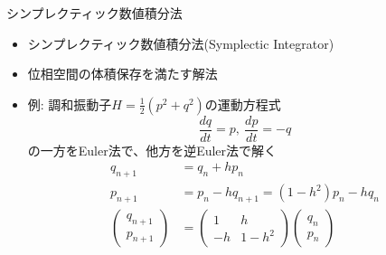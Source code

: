 \begin{frame}[t,fragile]{シンプレクティック数値積分法}
  \begin{itemize}
  \item シンプレクティック数値積分法(Symplectic Integrator)
  \item 位相空間の体積保存を満たす解法
  \item 例: 調和振動子$H=\frac{1}{2}(p^2+q^2)$の運動方程式
    \[
    \frac{dq}{dt} = p, \ \frac{dp}{dt} = -q
    \]
    の一方をEuler法で、他方を逆Euler法で解く
    \begin{align*}
      q_{n+1} &= q_n + h p_n \\
      p_{n+1} &= p_n - h q_{n+1} = (1-h^2) p_n - h q_n \\
      \begin{pmatrix} q_{n+1} \\ p_{n+1} \end{pmatrix} &= \begin{pmatrix} 1 & h \\ -h & 1-h^2 \end{pmatrix} \begin{pmatrix} q_{n} \\ p_{n} \end{pmatrix}
    \end{align*}
  \end{itemize}
\end{frame}
